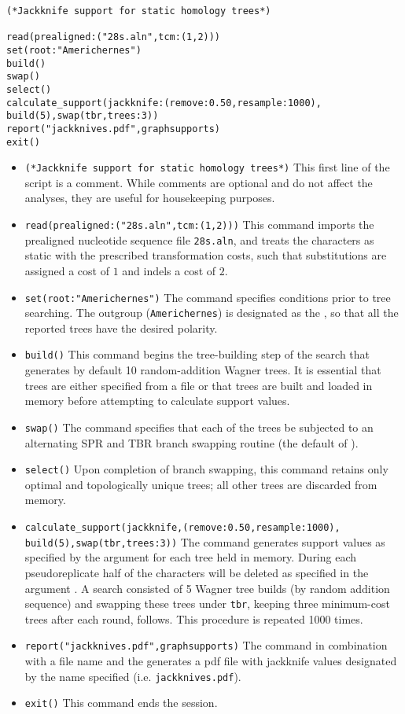\begin{verbatim}
(*Jackknife support for static homology trees*)

read(prealigned:("28s.aln",tcm:(1,2)))
set(root:"Americhernes")
build()
swap()
select()
calculate_support(jackknife:(remove:0.50,resample:1000), 
build(5),swap(tbr,trees:3))
report("jackknives.pdf",graphsupports)
exit()
\end{verbatim}

\begin{itemize}
\item \texttt{(*Jackknife support for static homology trees*)} This first line of the script is a comment. While
 comments are optional and do not affect the analyses, they are useful for housekeeping purposes.
\item \texttt{read(prealigned:("28s.aln",tcm:(1,2)))} This command imports the prealigned nucleotide sequence 
file \texttt{28s.aln}, and treats the characters as static with the prescribed transformation costs, such that
substitutions are assigned a cost of $ 1 $ and indels a cost of $ 2$.
\item \texttt{set(root:"Americhernes")} The  command specifies conditions prior to tree 
searching. The outgroup (\texttt{Americhernes}) is designated as the , so that all the reported 
trees have the desired polarity.     
\item \texttt{build()} This command begins the tree-building step of the search that generates by default 10 
random-addition Wagner trees. It is essential that trees are either specified from a file or that trees are built and loaded in 
memory before attempting to calculate support values.
\item \texttt{swap()} The  command specifies that each of the trees be subjected to an 
alternating SPR and TBR branch swapping routine (the default of \poy).
\item \texttt{select()} Upon completion of branch swapping, this command retains only optimal and topologically 
unique trees; all other trees are discarded from memory. 
\item \texttt{calculate\_support(jackknife,(remove:0.50,resample:1000),\\ build(5),swap(tbr,trees:3))} 
The  command generates support values as specified by the 
 argument for each tree held in 
memory. During each pseudoreplicate half of the characters will be deleted as specified in the argument
. A search consisted of 5 Wagner tree builds (by random addition sequence) 
and swapping these trees under \texttt{tbr}, keeping three minimum-cost trees
after each round, follows.  This procedure is repeated 1000 times.
\item \texttt{report("jackknives.pdf",graphsupports)}  The  command in combination with 
a file name and the  generates a pdf file with jackknife values designated by the 
name specified (i.e. \texttt{jackknives.pdf}). 
\item \texttt{exit()} This command ends the \poy session.
\end{itemize}

